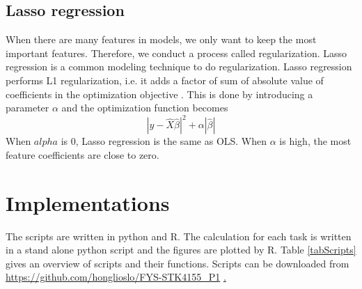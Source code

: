 \documentclass[a4paper]{article}
\begin{document}
\subsection{Lasso regression}
When there are many features in models, we only want to keep the most important features. Therefore, we conduct a process called regularization. Lasso regression is a common modeling technique to do regularization. Lasso regression performs L1 regularization, i.e. it adds a factor of sum of absolute value of coefficients in the optimization objective \cite{Sunil}. This is done by introducing a parameter $\alpha$ and the optimization function becomes 
$$
\left | y -\hat{X}\hat{\beta}  \right |^{2} + \alpha \left | \hat{\beta}  \right |
$$
When  $alpha$ is 0, Lasso regression is the same as OLS. When $\alpha$ is high, the most feature coefficients are close to zero.
\section{Implementations}\label{sec:Implementations}
The scripts are written in python and R. The calculation for each task is written in a stand alone  python script and the figures are plotted by R. Table \ref{tabScripts} gives an overview of scripts and their functions. Scripts can be downloaded from \url{https://github.com/honglioslo/FYS-STK4155_P1} \href{https://github.com/honglioslo/FYS-STK4155_P1}.
\end{document}
